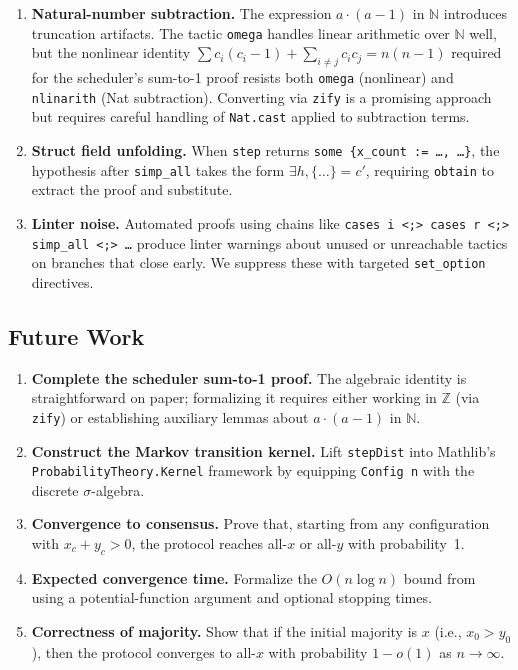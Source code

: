 \documentclass[11pt,a4paper]{article}
\begin{document}
\begin{enumerate}
  \item \textbf{Natural-number subtraction.}  The expression $a \cdot (a-1)$
        in $\mathbb{N}$ introduces truncation artifacts.  The tactic
        \texttt{omega} handles linear arithmetic over $\mathbb{N}$ well,
        but the nonlinear identity $\sum c_i(c_i - 1) + \sum_{i \neq j}
        c_i c_j = n(n-1)$ required for the scheduler's sum-to-1 proof
        resists both \texttt{omega} (nonlinear) and \texttt{nlinarith}
        (Nat subtraction).  Converting via \texttt{zify} is a promising
        approach but requires careful handling of \texttt{Nat.cast} applied
        to subtraction terms.

  \item \textbf{Struct field unfolding.}  When \texttt{step} returns
        \texttt{some \{x\_count := \ldots, \ldots\}}, the hypothesis after
        \texttt{simp\_all} takes the form $\exists h, \{\ldots\} = c'$,
        requiring \texttt{obtain} to extract the proof and substitute.

  \item \textbf{Linter noise.}  Automated proofs using chains like
        \texttt{cases i <;> cases r <;> simp\_all <;> \ldots} produce
        linter warnings about unused or unreachable tactics on branches
        that close early.  We suppress these with targeted
        \texttt{set\_option} directives.
\end{enumerate}

\subsection{Future Work}

\begin{enumerate}
  \item \textbf{Complete the scheduler sum-to-1 proof.}  The algebraic
        identity is straightforward on paper; formalizing it requires
        either working in $\mathbb{Z}$ (via \texttt{zify}) or establishing
        auxiliary lemmas about $a \cdot (a-1)$ in $\mathbb{N}$.

  \item \textbf{Construct the Markov transition kernel.}  Lift
        \texttt{stepDist} into Mathlib's \texttt{ProbabilityTheory.Kernel}
        framework by equipping \texttt{Config n} with the discrete
        $\sigma$-algebra.

  \item \textbf{Convergence to consensus.}  Prove that, starting from any
        configuration with $x_c + y_c > 0$, the protocol reaches all-$x$
        or all-$y$ with probability~1.

  \item \textbf{Expected convergence time.}  Formalize the $O(n \log n)$
        bound from~\cite{AngluinAE2008} using a potential-function argument
        and optional stopping times.

  \item \textbf{Correctness of majority.}  Show that if the initial
        majority is $x$ (i.e., $x_0 > y_0$), then the protocol converges
        to all-$x$ with probability $1 - o(1)$ as $n \to \infty$.
\end{enumerate}
\end{document}
